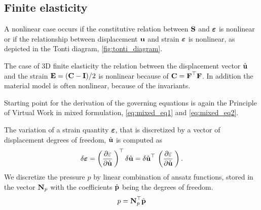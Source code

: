 \subsection{Finite elasticity}


A nonlinear case occurs if the constitutive relation between $\textbf{S}$ and $\boldsymbol{\varepsilon}$ is nonlinear or if the relationship between displacement $\textbf{u}$ and strain $\boldsymbol{\varepsilon}$ is nonlinear, as depicted in the Tonti diagram, \cref{fig:tonti_diagram}.

The case of 3D finite elasticity the relation between the displacement vector $\hat{\textbf{u}}$ and the strain $\textbf{E} = (\textbf{C} - \textbf{I})/2$ is nonlinear because of $\textbf{C} = \textbf{F}^\top \textbf{F}$. In addition the material model is often nonlinear, because of the invariants. 

Starting point for the derivation of the governing equations is again the Principle of Virtual Work in mixed formulation, \eqref{eq:mixed_eq1} and \eqref{eq:mixed_eq2}.

The variation of a strain quantity $\boldsymbol{\varepsilon}$, that is discretized by a vector of displacement degrees of freedom, $\hat{\textbf{u}}$ is computed as
\begin{equation*}
  \begin{array}{lll}
    \delta \bfeps = \left(\p{\eps}{\hat{\bfu}} \right)^\top \delta\hat{\bfu} = \delta\hat{\bfu}^\top\,\left(\p{\eps}{\hat{\bfu}} \right).
  \end{array}
\end{equation*}
We discretize the pressure $p$ by linear combination of ansatz functions, stored in the vector $\textbf{N}_p$ with the coefficients $\hat{\textbf{p}}$ being the degrees of freedom.
\begin{equation*}
  \begin{array}{lll}
    p = \textbf{N}_p^\top \hat{\textbf{p}}
  \end{array}
\end{equation*}

